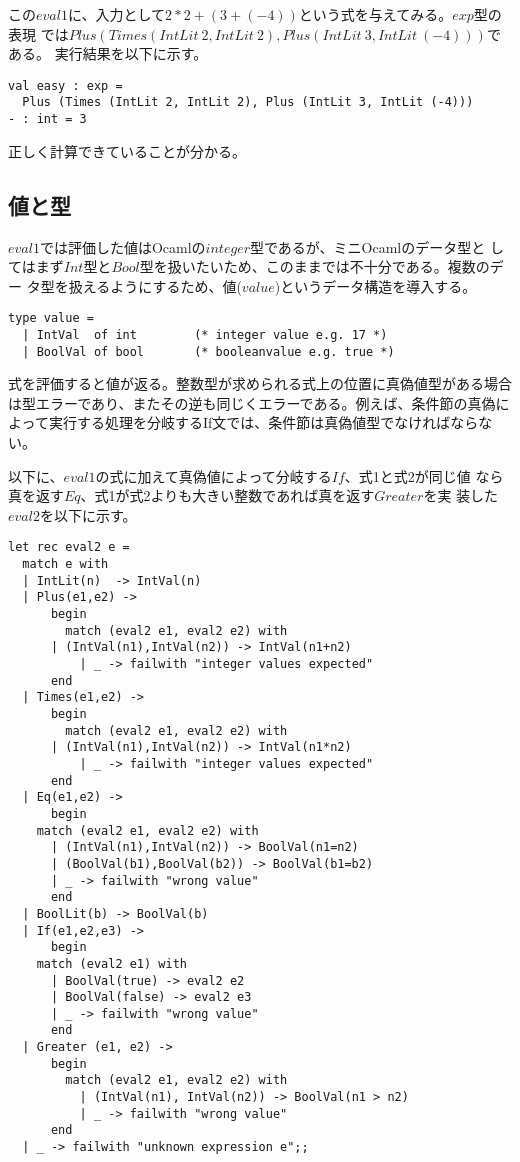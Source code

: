 \documentclass[a4paper,9pt]{jsarticle}
\begin{document}
この$eval1$に、入力として$2*2+(3+(-4))$という式を与えてみる。$exp$型の表現
では$Plus(Times(IntLit\ 2, IntLit\ 2), Plus(IntLit\ 3, IntLit\ (-4)))$である。
実行結果を以下に示す。

\begin{lstlisting}
val easy : exp =
  Plus (Times (IntLit 2, IntLit 2), Plus (IntLit 3, IntLit (-4)))
- : int = 3
\end{lstlisting}
正しく計算できていることが分かる。

\subsection{値と型}
$eval1$では評価した値はOcamlの$integer$型であるが、ミニOcamlのデータ型と
してはまず$Int$型と$Bool$型を扱いたいため、このままでは不十分である。複数のデー
タ型を扱えるようにするため、値($value$)というデータ構造を導入する。

\begin{lstlisting}
type value = 
  | IntVal  of int        (* integer value e.g. 17 *)
  | BoolVal of bool       (* booleanvalue e.g. true *)
\end{lstlisting}

式を評価すると値が返る。整数型が求められる式上の位置に真偽値型がある場合
は型エラーであり、またその逆も同じくエラーである。例えば、条件節の真偽に
よって実行する処理を分岐するIf文では、条件節は真偽値型でなければならない。

以下に、$eval1$の式に加えて真偽値によって分岐する$If$、式1と式2が同じ値
なら真を返す$Eq$、式1が式2よりも大きい整数であれば真を返す$Greater$を実
装した$eval2$を以下に示す。


\begin{lstlisting}
let rec eval2 e =
  match e with
  | IntLit(n)  -> IntVal(n)
  | Plus(e1,e2) ->   
      begin
        match (eval2 e1, eval2 e2) with
	  | (IntVal(n1),IntVal(n2)) -> IntVal(n1+n2)
          | _ -> failwith "integer values expected"
      end
  | Times(e1,e2) ->
      begin
        match (eval2 e1, eval2 e2) with
	  | (IntVal(n1),IntVal(n2)) -> IntVal(n1*n2)
          | _ -> failwith "integer values expected"
      end
  | Eq(e1,e2) ->
      begin
	match (eval2 e1, eval2 e2) with
	  | (IntVal(n1),IntVal(n2)) -> BoolVal(n1=n2)
	  | (BoolVal(b1),BoolVal(b2)) -> BoolVal(b1=b2)
	  | _ -> failwith "wrong value"
      end
  | BoolLit(b) -> BoolVal(b)
  | If(e1,e2,e3) ->
      begin
	match (eval2 e1) with
	  | BoolVal(true) -> eval2 e2
	  | BoolVal(false) -> eval2 e3
	  | _ -> failwith "wrong value"
      end
  | Greater (e1, e2) ->
      begin
        match (eval2 e1, eval2 e2) with
          | (IntVal(n1), IntVal(n2)) -> BoolVal(n1 > n2)
          | _ -> failwith "wrong value"
      end
  | _ -> failwith "unknown expression e";;
\end{lstlisting}
\end{document}
